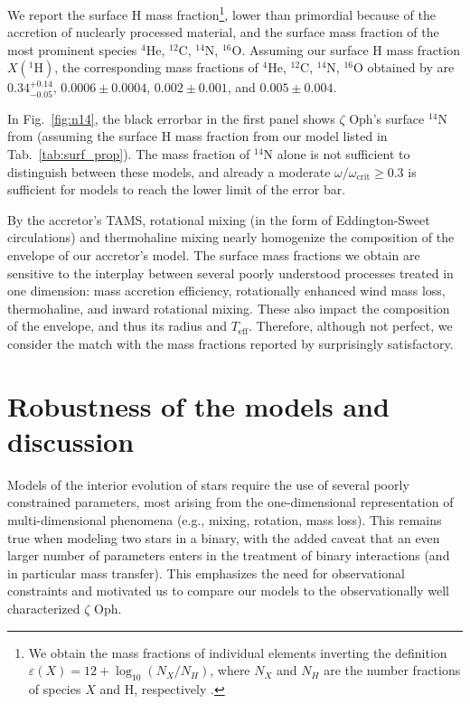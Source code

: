 \documentclass[twocolumn,twocolappendix,trackchanges]{aastex63}
\DeclareRobustCommand{\Figref}[1]{Fig.~\ref{#1}}
\DeclareRobustCommand{\Tabref}[1]{Tab.~\ref{#1}}
\newcommand{\zoph}{$\zeta$ Oph}
\begin{document}
We report the surface H mass fraction\footnote{We obtain the mass
  fractions of individual elements inverting the definition
  $\varepsilon(X)=12+\log_{10}(N_X/N_H)$, where $N_X$ and $N_H$ are
  the number fractions of species $X$ and H, respectively
  \citep[e.g.,][]{lodders:19}.}, lower than primordial because of the
accretion of nuclearly processed material, and the surface mass
fraction of the most prominent species $^4\mathrm{He}$,
$^{12}\mathrm{C}$, $^{14}\mathrm{N}$, $^{16}\mathrm{O}$.  Assuming our
surface H mass fraction $X(^1\mathrm{H})$, the corresponding mass
fractions of $^4\mathrm{He}$, $^{12}\mathrm{C}$, $^{14}\mathrm{N}$,
$^{16}\mathrm{O}$ obtained by  are
$0.34^{+0.14}_{-0.05}$, $0.0006\pm0.0004$, $0.002\pm0.001$, and
$0.005\pm0.004$.

In \Figref{fig:n14}, the black errorbar in the first panel shows
\zoph's surface $^{14}\mathrm{N}$ from 
(assuming the surface H mass fraction from our model listed in
\Tabref{tab:surf_prop}). The mass fraction of $^{14}\mathrm{N}$ alone
is not sufficient to distinguish between these models, and already a
moderate $\omega/\omega_\mathrm{crit}\geq0.3$ is sufficient for models
to reach the lower limit of the error bar.


By the accretor's TAMS, rotational mixing (in the
form of Eddington-Sweet circulations) and thermohaline mixing nearly
homogenize the composition of the envelope of our accretor's
model. The surface mass fractions we obtain are sensitive to the
interplay between several poorly understood processes treated in one
dimension: mass accretion efficiency, rotationally enhanced wind mass
loss, thermohaline, and inward rotational mixing. These also impact
the composition of the envelope, and thus its radius and
$T_\mathrm{eff}$. Therefore, although not perfect, we consider the
match with the mass fractions reported by 
surprisingly satisfactory.

\section{Robustness of the models and discussion}
\label{sec:discussion}

Models of the interior evolution of stars require the use of several
poorly constrained parameters, most arising from the one-dimensional
representation of multi-dimensional phenomena (e.g., mixing,
rotation, mass loss). This remains true when modeling two stars in a
binary, with the added caveat that an even larger number of parameters
enters in the treatment of binary interactions (and in particular mass
transfer). This emphasizes the need for observational constraints and
motivated us to compare our models to the observationally well
characterized \zoph.
\end{document}
